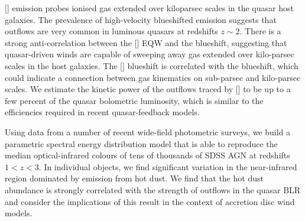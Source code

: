 [] emission probes ionised gas extended over kiloparsec scales in the quasar host galaxies. 
The prevalence of high-velocity blueshifted emission suggests that outflows are very common in luminous quasars at redshifts $z\sim2$. 
There is a strong anti-correlation between the [] EQW and the  blueshift, suggesting that quasar-driven winds are capable of sweeping away gas extended over kilo-parsec scales in the host galaxies. The [] blueshift is correlated with the  blueshift, which could indicate a connection between gas kinematics on sub-parsec and kilo-parsec scales. 
We estimate the kinetic power of the outflows traced by [] to be up to a few percent of the quasar bolometric luminosity, which is similar to the efficiencies required in recent quasar-feedback models. 

Using data from a number of recent wide-field photometric surveys, we build a parametric spectral energy distribution model that is able to reproduce the median optical-infrared colours of tens of thousands of SDSS AGN at redshifts $1 < z < 3$. 
In individual objects, we find significant variation in the near-infrared region dominated by emission from hot dust.   
We find that the hot dust abundance is strongly correlated with the strength of outflows in the quasar BLR and consider the implications of this result in the context of accretion disc wind models.


\vfill

\endgroup			

\vfill